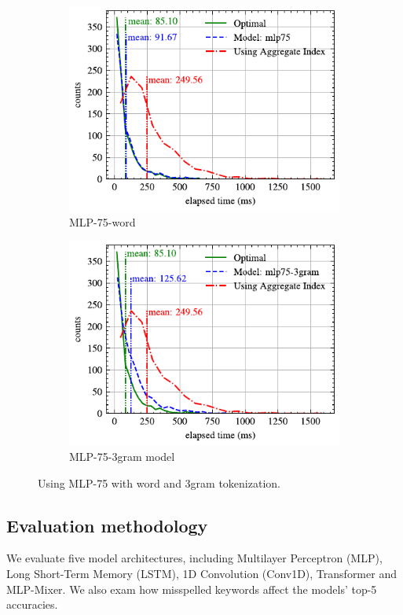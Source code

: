 \documentclass[conference]{IEEEtran}
\begin{document}
\begin{figure}[t]
	\centering
	\begin{subfigure}{0.45\textwidth}
		\centering
		\includegraphics[]{graphics/perf_dist_mlp75_A.pdf}
		\caption{MLP-75-word}
		\label{fig:top_k_mlp_B}
	\end{subfigure}
    \hfill
    \begin{subfigure}{0.45\textwidth}
		\centering
		\includegraphics[]{graphics/perf_dist_mlp75_3gram_A.pdf}
		\caption{MLP-75-3gram model}
		\label{fig:perf-mlp75}
	\end{subfigure}
	\caption{Using MLP-75 with word and 3gram tokenization.}
	\label{fig:accuracy-mlp}
\end{figure}

\subsection{Evaluation methodology}
We evaluate five model architectures, including Multilayer Perceptron (MLP), Long Short-Term Memory (LSTM), 1D Convolution (Conv1D), Transformer and MLP-Mixer. We also exam how misspelled keywords affect the models' top-5 accuracies.
\end{document}
